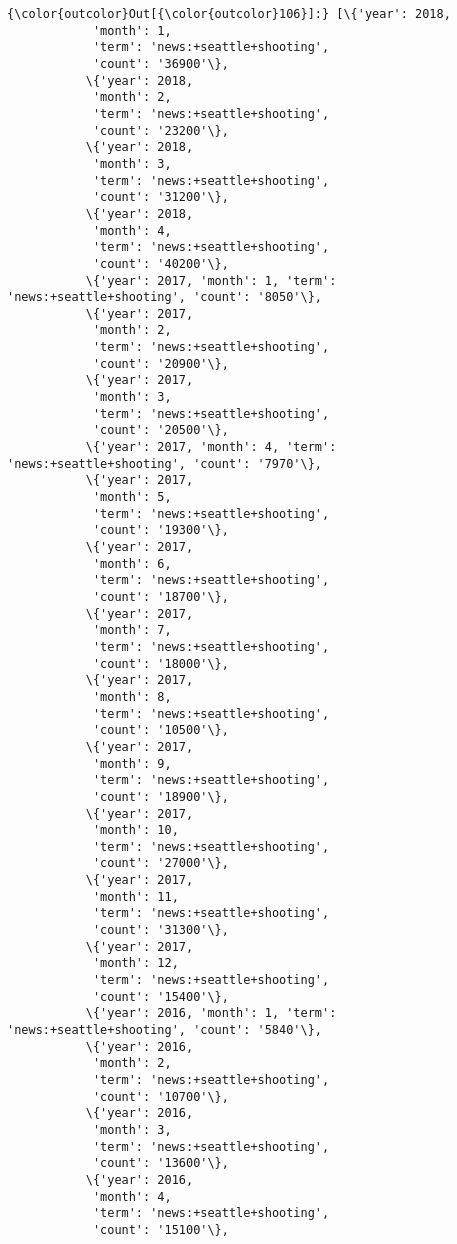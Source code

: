 \documentclass[11pt]{article}
\begin{document}
\begin{Verbatim}[commandchars=\\\{\}]
{\color{outcolor}Out[{\color{outcolor}106}]:} [\{'year': 2018,
            'month': 1,
            'term': 'news:+seattle+shooting',
            'count': '36900'\},
           \{'year': 2018,
            'month': 2,
            'term': 'news:+seattle+shooting',
            'count': '23200'\},
           \{'year': 2018,
            'month': 3,
            'term': 'news:+seattle+shooting',
            'count': '31200'\},
           \{'year': 2018,
            'month': 4,
            'term': 'news:+seattle+shooting',
            'count': '40200'\},
           \{'year': 2017, 'month': 1, 'term': 'news:+seattle+shooting', 'count': '8050'\},
           \{'year': 2017,
            'month': 2,
            'term': 'news:+seattle+shooting',
            'count': '20900'\},
           \{'year': 2017,
            'month': 3,
            'term': 'news:+seattle+shooting',
            'count': '20500'\},
           \{'year': 2017, 'month': 4, 'term': 'news:+seattle+shooting', 'count': '7970'\},
           \{'year': 2017,
            'month': 5,
            'term': 'news:+seattle+shooting',
            'count': '19300'\},
           \{'year': 2017,
            'month': 6,
            'term': 'news:+seattle+shooting',
            'count': '18700'\},
           \{'year': 2017,
            'month': 7,
            'term': 'news:+seattle+shooting',
            'count': '18000'\},
           \{'year': 2017,
            'month': 8,
            'term': 'news:+seattle+shooting',
            'count': '10500'\},
           \{'year': 2017,
            'month': 9,
            'term': 'news:+seattle+shooting',
            'count': '18900'\},
           \{'year': 2017,
            'month': 10,
            'term': 'news:+seattle+shooting',
            'count': '27000'\},
           \{'year': 2017,
            'month': 11,
            'term': 'news:+seattle+shooting',
            'count': '31300'\},
           \{'year': 2017,
            'month': 12,
            'term': 'news:+seattle+shooting',
            'count': '15400'\},
           \{'year': 2016, 'month': 1, 'term': 'news:+seattle+shooting', 'count': '5840'\},
           \{'year': 2016,
            'month': 2,
            'term': 'news:+seattle+shooting',
            'count': '10700'\},
           \{'year': 2016,
            'month': 3,
            'term': 'news:+seattle+shooting',
            'count': '13600'\},
           \{'year': 2016,
            'month': 4,
            'term': 'news:+seattle+shooting',
            'count': '15100'\},

\end{Verbatim}
\end{document}
